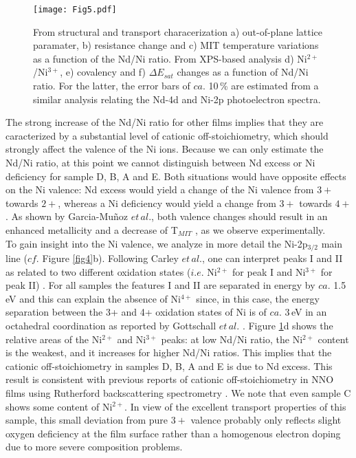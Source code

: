 \documentclass[aip,graphicx,numerical]{revtex4-1}
\begin{document}
\begin{figure}
  \texttt{[image: Fig5.pdf]}
  \caption{From structural and transport characerization a) out-of-plane lattice paramater, b) resistance change and c) MIT temperature variations as a function of the Nd/Ni ratio. From XPS-based analysis d) Ni$^{2+}$/Ni$^{3+}$, e) covalency and f) $\Delta E_{sat}$ changes as a function of Nd/Ni ratio. For the latter, the error bars of $ca.$ 10\,\% are estimated from a similar analysis relating the Nd-4d and Ni-2p photoelectron spectra.}
  \label{fig5}
\end{figure}
The strong increase of the Nd/Ni ratio for other films implies that they are caracterized by a substantial level of cationic off-stoichiometry, which should strongly affect the valence of the Ni ions. Because we can only estimate the Nd/Ni ratio, at this point we cannot distinguish between Nd excess or Ni deficiency for sample D, B, A and E. Both situations would have opposite effects on the Ni valence: Nd excess would yield a change of the Ni valence from $3+$ towards $2+$, whereas a Ni deficiency would yield a change from $3+$ towards $4+$. As shown by Garcia-Mu\~{n}oz $et\,al.$, both valence changes should result in an enhanced metallicity and a decrease of T$_{MIT}$ \cite{Garc_a_Mu_oz_1995} , as we observe experimentally. \\
To gain insight into the Ni valence, we analyze in more detail the Ni-2p$_{3/2}$ main line ($cf.$ Figure \ref{fig4}b). Following Carley $et\,al.$, one can interpret peaks I and II as related to two different oxidation states ($i.e.$ Ni$^{2+}$ for peak I and Ni$^{3+}$ for peak II)\cite{Carley1999} . For all samples the features I and II are separated in energy by $ca.$ 1.5\,eV and this can explain the absence of Ni$^{4+}$ since, in this case, the energy separation between the 3+ and 4+ oxidation states of Ni is of $ca.$ 3\,eV in an octahedral coordination as reported by Gottschall $et\,al.$ \cite{Gottschall} . Figure \ref{fig5}d shows the relative areas of the Ni$^{2+}$ and Ni$^{3+}$ peaks: at low Nd/Ni ratio, the Ni$^{2+}$ content is the weakest, and it increases for higher Nd/Ni ratios. This implies that the cationic off-stoichiometry in samples D, B, A and E is due to Nd excess. This result is consistent with previous reports of cationic off-stoichiometry in NNO films using Rutherford backscattering spectrometry \cite{Breckenfeld_2014} . We note that even sample C shows some content of Ni$^{2+}$. In view of the excellent transport properties of this sample, this small deviation from pure $3+$ valence probably only reflects slight oxygen deficiency at the film surface rather than a homogenous electron doping due to more severe composition problems.\\
\end{document}
